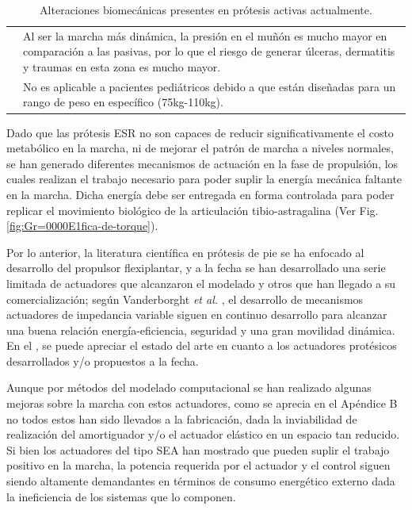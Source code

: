 \documentclass[12pt,english]{article}
\providecommand{\tabularnewline}{\\}
\begin{document}
\begin{center}
\begin{table}
\caption{\label{tab:Alteraciones-biomec=0000E1nicas-activas}Alteraciones biomecánicas
presentes en prótesis activas actualmente.}


\centering{}%
\begin{tabular}[b]{|>{\raggedright}p{3cm}|>{\centering}p{125mm}|}
\hline 
\multirow{2}{3cm}{\textbf{Alteraciones biomecánicas}} & Al ser la marcha más dinámica, la presión en el muñón es mucho mayor
en comparación a las pasivas, por lo que el riesgo de generar úlceras,
dermatitis y traumas en esta zona es mucho mayor. \cite{Wolf2009}\tabularnewline
\cline{2-2} 
 & No es aplicable a pacientes pediátricos debido a que están diseñadas
para un rango de peso en específico (75kg-110kg)\cite{BIOMASME}.\tabularnewline
\hline 
\end{tabular}
\end{table}

\par\end{center}
Dado que las prótesis ESR no son capaces de reducir significativamente
el costo metabólico en la marcha, ni de mejorar el patrón de marcha
a niveles normales, se han generado diferentes mecanismos de actuación
en la fase de propulsión, los cuales realizan el trabajo necesario
para poder suplir la energía mecánica faltante en la marcha. Dicha
energía debe ser entregada en forma controlada para poder replicar
el movimiento biológico de la articulación tibio-astragalina (Ver
Fig. \ref{fig:Gr=0000E1fica-de-torque}).

Por lo anterior, la literatura científica en prótesis de pie se ha
enfocado al desarrollo del propulsor flexiplantar, y a la fecha se
han desarrollado una serie limitada de actuadores que alcanzaron el
modelado y otros que han llegado a su comercialización; según Vanderborght
\emph{et al.} \cite{Vanderborght2013}, el desarrollo de mecanismos
actuadores de impedancia variable siguen en continuo desarrollo para
alcanzar una buena relación energía-eficiencia, seguridad y una gran
movilidad dinámica. En el , se puede
apreciar el estado del arte en cuanto a los actuadores protésicos
desarrollados y/o propuestos a la fecha.

Aunque por métodos del modelado computacional se han realizado algunas
mejoras sobre la marcha con estos actuadores, como se aprecia en el
Apéndice B no todos estos han sido llevados a la fabricación, dada
la inviabilidad de realización del amortiguador y/o el actuador elástico
en un espacio tan reducido. Si bien los actuadores del tipo SEA han
mostrado que pueden suplir el trabajo positivo en la marcha, la potencia
requerida por el actuador y el control siguen siendo altamente demandantes
en términos de consumo energético externo dada la ineficiencia de
los sistemas que lo componen.
\end{document}
